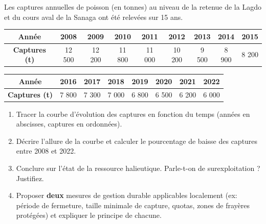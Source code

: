 \documentclass[11pt]{article}
\begin{document}
\begin{exercice}
Les captures annuelles de poisson (en tonnes) au niveau de la retenue de la Lagdo et du cours aval de la Sanaga ont été relevées sur 15 ans.

\begin{center}
\begin{tabular}{|c|c|c|c|c|c|c|c|c|}\hline
\textbf{Année} & 2008 & 2009 & 2010 & 2011 & 2012 & 2013 & 2014 & 2015 \\ \hline
\textbf{Captures (t)} & 12 500 & 12 200 & 11 800 & 11 000 & 10 200 & 9 500 & 8 900 & 8 200 \\ \hline
\end{tabular}
\end{center}
\begin{center}
\begin{tabular}{|c|c|c|c|c|c|c|c|}\hline
\textbf{Année} & 2016 & 2017 & 2018 & 2019 & 2020 & 2021 & 2022 \\ \hline
\textbf{Captures (t)} & 7 800 & 7 300 & 7 000 & 6 800 & 6 500 & 6 200 & 6 000 \\ \hline
\end{tabular}
\end{center}

\begin{enumerate}
\item Tracer la courbe d'évolution des captures en fonction du temps (années en abscisses, captures en ordonnées).
\item Décrire l'allure de la courbe et calculer le pourcentage de baisse des captures entre 2008 et 2022.
\item Conclure sur l'état de la ressource halieutique. Parle-t-on de surexploitation ? Justifiez.
\item Proposer \textbf{deux} mesures de gestion durable applicables localement (ex: période de fermeture, taille minimale de capture, quotas, zones de frayères protégées) et expliquer le principe de chacune.
\end{enumerate}
\end{exercice}
\end{document}
